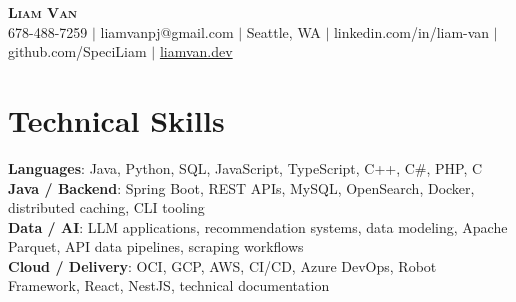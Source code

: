 \documentclass[letterpaper,11pt]{article}
\begin{document}

%
\begin{center}
    \textbf{\Huge \scshape Liam Van} \\ \vspace{1pt}
    \small 678-488-7259 $|$ \small {liamvanpj@gmail.com} $|$ Seattle, WA
 {{$|$ linkedin.com/in/liam-van} {$|$ github.com/SpeciLiam} {$|$ \href{https://liamvan.dev}{liamvan.dev}}}

\end{center}

\section{Technical Skills}
 \begin{itemize}[leftmargin=0.15in, label={}]
    \small{\item{
     \textbf{Languages}{: Java, Python, SQL, JavaScript, TypeScript, C++, C\#, PHP, C} \\
     \textbf{Java / Backend}{: Spring Boot, REST APIs, MySQL, OpenSearch, Docker, distributed caching, CLI tooling} \\
     \textbf{Data / AI}{: LLM applications, recommendation systems, data modeling, Apache Parquet, API data pipelines, scraping workflows} \\
     \textbf{Cloud / Delivery}{: OCI, GCP, AWS, CI/CD, Azure DevOps, Robot Framework, React, NestJS, technical documentation} \\
    }}
 \end{itemize}
%

\end{document}
